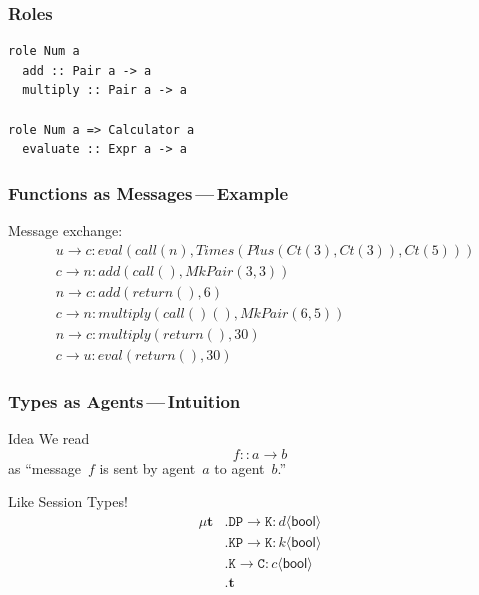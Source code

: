 \documentclass{beamer}
\begin{document}
\begin{frame}[fragile]
\frametitle{Roles}
\begin{lstlisting}
role Num a
  add :: Pair a -> a
  multiply :: Pair a -> a

role Num a => Calculator a
  evaluate :: Expr a -> a
\end{lstlisting}
\end{frame}

\begin{frame}[fragile]
\frametitle{Functions as Messages\,---\,Example}
Message exchange:
\begin{align*}
&u\to c: eval(call(n), Times(Plus(Ct(3), Ct(3)), Ct(5)))\\
&c\to n: add(call(), MkPair(3,3))\\
&n\to c: add(return(),6)\\
&c\to n: multiply(call()(), MkPair(6,5))\\
&n\to c: multiply(return(), 30)\\
&c\to u: eval(return(), 30)
\end{align*}
\note[item]{}
\end{frame}

\begin{frame}[fragile]
\frametitle{Types as Agents\,---\,Intuition}
\begin{block}{Idea}
We read \[f :: a \to b\] as
``message~$f$ is sent by agent~$a$ to agent~$b$.''
\end{block}
\begin{block}{Like Session Types!}
\begin{align*}
\mu\mathbf{t}&.\mathtt{DP}\to\mathtt{K}:d\langle\mathsf{bool}\rangle \\
  &.\mathtt{KP}\to\mathtt{K}:k\langle\mathsf{bool}\rangle\\
  &.\mathtt{K}\to\mathtt{C}:c\langle\mathsf{bool}\rangle\\
  &.\mathbf{t}
\end{align*}
\end{block}
\note[item]{}
\end{frame}
\end{document}
